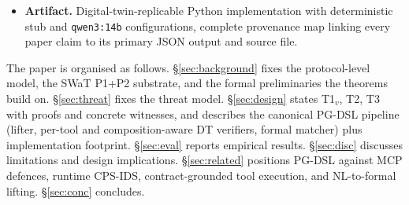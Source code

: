 \begin{itemize}
      (description--physics gaps, name collisions, composition) and
      where it has known limits (read-tool sensor aliasing, prompt
      injection embedded in description text). A real-agent campaign
      ($N=10$ operational-condition trials per cell) on
      \texttt{qwen3:14b} demonstrates one end-to-end
      description-poisoning exploit that PG-DSL blocks before
      catalog exposure, and confirms that post-admission spoofing
      remains outside the admission-time scope.
\item \textbf{Artifact.} Digital-twin-replicable Python implementation
      with deterministic stub and \texttt{qwen3:14b} configurations,
      complete provenance map linking every paper claim to its
      primary JSON output and source file.
\end{itemize}

The paper is organised as follows.
\S\ref{sec:background} fixes the protocol-level model, the SWaT
P1+P2 substrate, and the formal preliminaries the theorems build on.
\S\ref{sec:threat} fixes the threat model.
\S\ref{sec:design} states T1${}_v$, T2, T3 with proofs and concrete
witnesses, and describes the canonical PG-DSL pipeline (lifter,
per-tool and composition-aware DT verifiers, formal matcher) plus
implementation footprint.
\S\ref{sec:eval} reports empirical results.
\S\ref{sec:disc} discusses limitations and design implications.
\S\ref{sec:related} positions PG-DSL against MCP defences, runtime
CPS-IDS, contract-grounded tool execution, and NL-to-formal lifting.
\S\ref{sec:conc} concludes.

